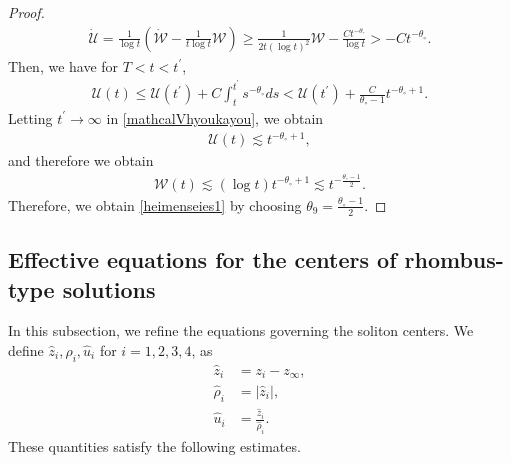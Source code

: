 \documentclass[reqno]{amsart}
\theoremstyle{plain}
\theoremstyle{definition}
\numberwithin{equation}{section}
\begin{document}
\begin{proof}
\begin{align}\label{Vupper}
\dot{\mathcal{U}}=\frac{1}{\log{t}}\left(\dot{\mathcal{W}}-\frac{1}{t\log{t}}\mathcal{W}\right)\geq \frac{1}{2t(\log{t})^2}\mathcal{W}-\frac{Ct^{-\theta_{\circ}}}{\log{t}}>-Ct^{-\theta_{\circ}}.
\end{align}
Then, we have for $T<t<t^{\prime}$,
\begin{align}\label{mathcalVhyoukayou}
\mathcal{U}(t)\leq \mathcal{U}(t^{\prime})+C\int_t^{t^{\prime}}s^{-\theta_{\circ}}ds<\mathcal{U}(t^{\prime})+\frac{C}{\theta_{\circ}-1}t^{-\theta_{\circ}+1}.
\end{align}
Letting $t^{\prime}\to\infty$ in \eqref{mathcalVhyoukayou}, we obtain
\begin{align*}
\mathcal{U}(t)\lesssim t^{-\theta_{\circ}+1},
\end{align*}
and therefore we obtain
\begin{align*}
\mathcal{W}(t)\lesssim (\log{t})t^{-\theta_{\circ}+1}\lesssim  t^{-\frac{\theta_{\circ}-1}{2}}.
\end{align*}
Therefore, we obtain \eqref{heimenseies1} by choosing $\theta_9=\frac{\theta_{\circ}-1}{2}$.
\end{proof}





\subsection{Effective equations for the centers of rhombus-type solutions}

In this subsection, we refine the equations governing the soliton centers. We define $\hat{z}_i, \hat{\rho}_i, \hat{u}_i$ for $i=1,2,3,4$, as
\begin{align*}
\hat{z}_i&=z_i-z_{\infty},
\\
\hat{\rho}_i&=\left|\hat{z}_i\right|,
\\
\hat{u}_i&=\frac{\hat{z}_i}{\hat{\rho}_i}.
\end{align*}
These quantities satisfy the following estimates.
\end{document}
